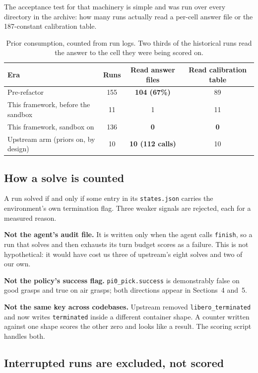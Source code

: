 \documentclass[11pt,a4paper]{article}
\begin{document}
The acceptance test for that machinery is simple and was run over every
directory in the archive: how many runs actually read a per-cell answer file or
the 187-constant calibration table.

\begin{table}[htbp]
\centering
\small
\begin{tabular}{@{}l c c c@{}}
\toprule
\textbf{Era} & \textbf{Runs} & \textbf{Read answer files} & \textbf{Read calibration table} \\
\midrule
Pre-refactor & 155 & \textbf{104 (67\%)} & 89 \\
This framework, before the sandbox & 11 & 1 & 11 \\
This framework, sandbox on & 136 & \textbf{0} & \textbf{0} \\
Upstream arm (priors on, by design) & 10 & \textbf{10 (112 calls)} & 10 \\
\bottomrule
\end{tabular}
\caption{Prior consumption, counted from run logs. Two thirds of the historical
runs read the answer to the cell they were being scored on.}
\end{table}

\subsection{How a solve is counted}

A run solved if and only if some entry in its \texttt{states.json} carries the
environment's own termination flag. Three weaker signals are rejected, each for
a measured reason.

\textbf{Not the agent's audit file.} It is written only when the agent calls
\texttt{finish}, so a run that solves and then exhausts its turn budget scores
as a failure. This is not hypothetical: it would have cost us three of
upstream's eight solves and two of our own.

\textbf{Not the policy's success flag.} \texttt{pi0\_pick.success} is
demonstrably false on good grasps and true on air grasps; both directions appear
in Sections~4 and~5.

\textbf{Not the same key across codebases.} Upstream removed
\texttt{libero\_terminated} and now writes \texttt{terminated} inside a
different container shape. A counter written against one shape scores the other
zero and looks like a result. The scoring script handles both.

\subsection{Interrupted runs are excluded, not scored}
\end{document}
